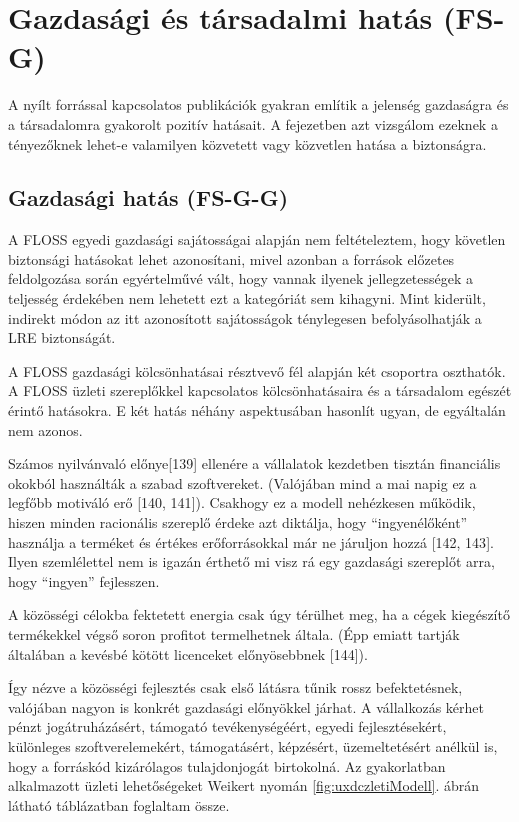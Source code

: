 \documentclass[12pt,magyar,a4paper,oneside]{scrreprt}
\begin{document}
\hypertarget{gazdasuxe1gi-uxe9s-tuxe1rsadalmi-hatuxe1s-fs-g}{%
\section{Gazdasági és társadalmi hatás
(FS-G)}\label{gazdasuxe1gi-uxe9s-tuxe1rsadalmi-hatuxe1s-fs-g}}

A nyílt forrással kapcsolatos publikációk gyakran említik a jelenség
gazdaságra és a társadalomra gyakorolt pozitív hatásait. A fejezetben
azt vizsgálom ezeknek a tényezőknek lehet-e valamilyen közvetett vagy
közvetlen hatása a biztonságra.

\hypertarget{sec:FS-G-G}{%
\subsection{Gazdasági hatás (FS-G-G)}\label{sec:FS-G-G}}

A FLOSS egyedi gazdasági sajátosságai alapján nem feltételeztem, hogy
követlen biztonsági hatásokat lehet azonosítani, mivel azonban a
források előzetes feldolgozása során egyértelművé vált, hogy vannak
ilyenek jellegzetességek a teljesség érdekében nem lehetett ezt a
kategóriát sem kihagyni. Mint kiderült, indirekt módon az itt
azonosított sajátosságok ténylegesen befolyásolhatják a LRE biztonságát.

A FLOSS gazdasági kölcsönhatásai résztvevő fél alapján két csoportra
oszthatók. A FLOSS üzleti szereplőkkel kapcsolatos kölcsönhatásaira és a
társadalom egészét érintő hatásokra. E két hatás néhány aspektusában
hasonlít ugyan, de egyáltalán nem azonos.

Számos nyilvánvaló előnye{[}139{]} ellenére a vállalatok kezdetben
tisztán financiális okokból használták a szabad szoftvereket. (Valójában
mind a mai napig ez a legfőbb motiváló erő {[}140, 141{]}). Csakhogy ez
a modell nehézkesen működik, hiszen minden racionális szereplő érdeke
azt diktálja, hogy ``ingyenélőként'' használja a terméket és értékes
erőforrásokkal már ne járuljon hozzá {[}142, 143{]}. Ilyen szemlélettel
nem is igazán érthető mi visz rá egy gazdasági szereplőt arra, hogy
``ingyen'' fejlesszen.

A közösségi célokba fektetett energia csak úgy térülhet meg, ha a cégek
kiegészítő termékekkel végső soron profitot termelhetnek általa. (Épp
emiatt tartják általában a kevésbé kötött licenceket előnyösebbnek
{[}144{]}).

Így nézve a közösségi fejlesztés csak első látásra tűnik rossz
befektetésnek, valójában nagyon is konkrét gazdasági előnyökkel járhat.
A vállalkozás kérhet pénzt jogátruházásért, támogató tevékenységéért,
egyedi fejlesztésekért, különleges szoftverelemekért, támogatásért,
képzésért, üzemeltetésért anélkül is, hogy a forráskód kizárólagos
tulajdonjogát birtokolná. Az gyakorlatban alkalmazott üzleti
lehetőségeket Weikert nyomán \ref{fig:uxdczletiModell}. ábrán látható
táblázatban foglaltam össze.
\end{document}
